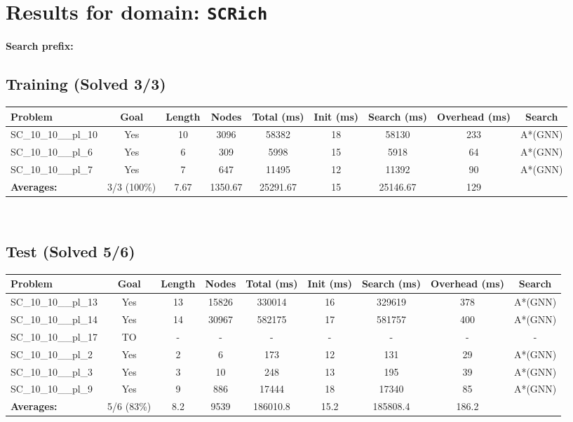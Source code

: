 \documentclass{article}
\begin{document}
\section*{Results for domain: \texttt{SCRich}}
\textbf{Search prefix:} 
\\[0.5cm]
\subsection*{Training (Solved 3/3)}
\begin{tabular}{lcccccccc}
\toprule
Problem & Goal & Length & Nodes & Total (ms) & Init (ms) & Search (ms) & Overhead (ms) & Search \\
\midrule
SC\_10\_10\_\_pl\_10 & Yes & 10 & 3096 & 58382 & 18 & 58130 & 233 & A*(GNN) \\
SC\_10\_10\_\_pl\_6 & Yes & 6 & 309 & 5998 & 15 & 5918 & 64 & A*(GNN) \\
SC\_10\_10\_\_pl\_7 & Yes & 7 & 647 & 11495 & 12 & 11392 & 90 & A*(GNN) \\
\textbf{Averages:} & 3/3 (100\%) & 7.67 & 1350.67 & 25291.67 & 15 & 25146.67 & 129 & \\
\bottomrule
\end{tabular}
\\[0.7cm]
\subsection*{Test (Solved 5/6)}
\begin{tabular}{lcccccccc}
\toprule
Problem & Goal & Length & Nodes & Total (ms) & Init (ms) & Search (ms) & Overhead (ms) & Search \\
\midrule
SC\_10\_10\_\_pl\_13 & Yes & 13 & 15826 & 330014 & 16 & 329619 & 378 & A*(GNN) \\
SC\_10\_10\_\_pl\_14 & Yes & 14 & 30967 & 582175 & 17 & 581757 & 400 & A*(GNN) \\
SC\_10\_10\_\_pl\_17 & TO & - & - & - & - & - & - & - \\
SC\_10\_10\_\_pl\_2 & Yes & 2 & 6 & 173 & 12 & 131 & 29 & A*(GNN) \\
SC\_10\_10\_\_pl\_3 & Yes & 3 & 10 & 248 & 13 & 195 & 39 & A*(GNN) \\
SC\_10\_10\_\_pl\_9 & Yes & 9 & 886 & 17444 & 18 & 17340 & 85 & A*(GNN) \\
\textbf{Averages:} & 5/6 (83\%) & 8.2 & 9539 & 186010.8 & 15.2 & 185808.4 & 186.2 & \\
\bottomrule
\end{tabular}
\\[0.7cm]
\end{document}
